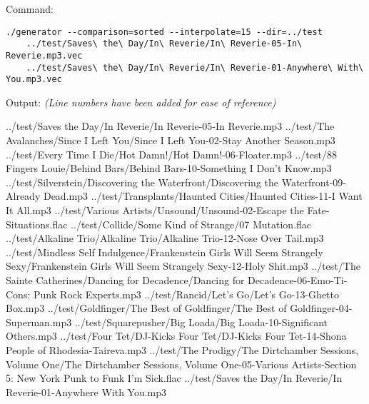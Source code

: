 Command:
\begin{verbatim}
./generator --comparison=sorted --interpolate=15 --dir=../test
    ../test/Saves\ the\ Day/In\ Reverie/In\ Reverie-05-In\ Reverie.mp3.vec
    ../test/Saves\ the\ Day/In\ Reverie/In\ Reverie-01-Anywhere\ With\ You.mp3.vec
\end{verbatim}
Output: \small \emph{(Line numbers have been added for ease of reference)}
\begin{listing}{1}
../test/Saves the Day/In Reverie/In Reverie-05-In Reverie.mp3
../test/The Avalanches/Since I Left You/Since I Left You-02-Stay Another Season.mp3
../test/Every Time I Die/Hot Damn!/Hot Damn!-06-Floater.mp3
../test/88 Fingers Louie/Behind Bars/Behind Bars-10-Something I Don't Know.mp3
../test/Silverstein/Discovering the Waterfront/Discovering the Waterfront-09-Already Dead.mp3
../test/Transplants/Haunted Cities/Haunted Cities-11-I Want It All.mp3
../test/Various Artists/Unsound/Unsound-02-Escape the Fate-Situations.flac
../test/Collide/Some Kind of Strange/07 Mutation.flac
../test/Alkaline Trio/Alkaline Trio/Alkaline Trio-12-Nose Over Tail.mp3
../test/Mindless Self Indulgence/Frankenstein Girls Will Seem Strangely Sexy/Frankenstein Girls Will Seem Strangely Sexy-12-Holy Shit.mp3
../test/The Sainte Catherines/Dancing for Decadence/Dancing for Decadence-06-Emo-Ti-Cons: Punk Rock Experts.mp3
../test/Rancid/Let's Go/Let's Go-13-Ghetto Box.mp3
../test/Goldfinger/The Best of Goldfinger/The Best of Goldfinger-04-Superman.mp3
../test/Squarepusher/Big Loada/Big Loada-10-Significant Others.mp3
../test/Four Tet/DJ-Kicks Four Tet/DJ-Kicks Four Tet-14-Shona People of Rhodesia-Taireva.mp3
../test/The Prodigy/The Dirtchamber Sessions, Volume One/The Dirtchamber Sessions, Volume One-05-Various Artists-Section 5: New York  Punk to Funk  I'm Sick.flac
../test/Saves the Day/In Reverie/In Reverie-01-Anywhere With You.mp3
\end{listing}


